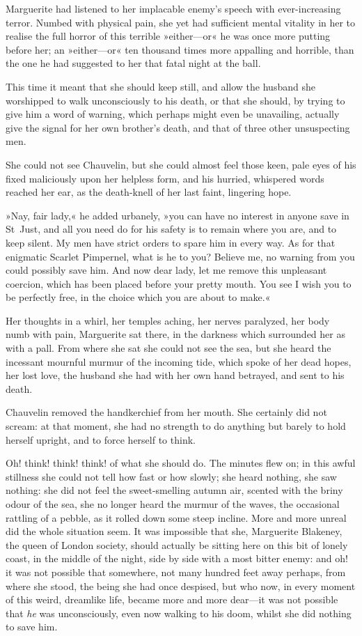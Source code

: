 Marguerite had listened to her implacable enemy's speech with ever-increasing terror. Numbed with physical pain, she yet had sufficient mental vitality in her to realise the full horror of this terrible »either—or« he was once more putting before her; an »either—or« ten thousand times more appalling and horrible, than the one he had suggested to her that fatal night at the ball.

This time it meant that she should keep still, and allow the husband she worshipped to walk unconsciously to his death, or that she should, by trying to give him a word of warning, which perhaps might even be unavailing, actually give the signal for her own brother's death, and that of three other unsuspecting men.

She could not see Chauvelin, but she could almost feel those keen, pale eyes of his fixed maliciously upon her helpless form, and his hurried, whispered words reached her ear, as the death-knell of her last faint, lingering hope.

»Nay, fair lady,« he added urbanely, »you can have no interest in anyone save in St~Just, and all you need do for his safety is to remain where you are, and to keep silent. My men have strict orders to spare him in every way. As for that enigmatic Scarlet Pimpernel, what is he to you? Believe me, no warning from you could possibly save him. And now dear lady, let me remove this unpleasant coercion, which has been placed before your pretty mouth. You see I wish you to be perfectly free, in the choice which you are about to make.«

Her thoughts in a whirl, her temples aching, her nerves paralyzed, her body numb with pain, Marguerite sat there, in the darkness which surrounded her as with a pall. From where she sat she could not see the sea, but she heard the incessant mournful murmur of the incoming tide, which spoke of her dead hopes, her lost love, the husband she had with her own hand betrayed, and sent to his death.

Chauvelin removed the handkerchief from her mouth. She certainly did not scream: at that moment, she had no strength to do anything but barely to hold herself upright, and to force herself to think.

Oh! think! think! think! of what she should do. The minutes flew on; in this awful stillness she could not tell how fast or how slowly; she heard nothing, she saw nothing: she did not feel the sweet-smelling autumn air, scented with the briny odour of the sea, she no longer heard the murmur of the waves, the occasional rattling of a pebble, as it rolled down some steep incline. More and more unreal did the whole situation seem. It was impossible that she, Marguerite Blakeney, the queen of London society, should actually be sitting here on this bit of lonely coast, in the middle of the night, side by side with a most bitter enemy: and oh! it was not possible that somewhere, not many hundred feet away perhaps, from where she stood, the being she had once despised, but who now, in every moment of this weird, dreamlike life, became more and more dear—it was not possible that \textit{he} was unconsciously, even now walking to his doom, whilst she did nothing to save him.

